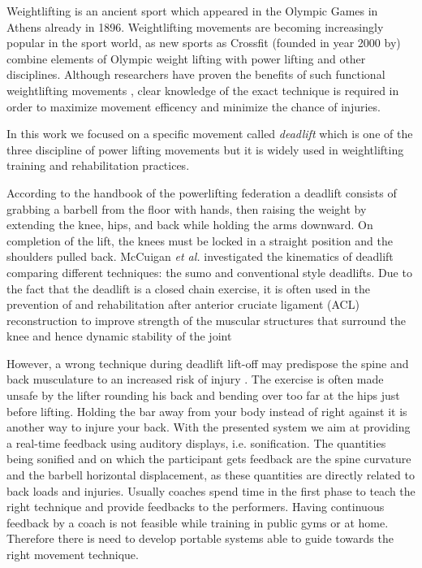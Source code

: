 \documentclass[10pt,letterpaper]{article}
\begin{document}
Weightlifting is an ancient sport which appeared in the Olympic Games in Athens already in 1896. Weightlifting movements are becoming increasingly popular in the sport world, as new sports as Crossfit (founded in year 2000 by) combine elements of Olympic weight lifting with power lifting and other disciplines.
Although researchers have proven the benefits of such functional weightlifting movements \cite{smith2013crossfit}, clear knowledge of the exact technique is required in order to maximize movement efficency and minimize the chance of injuries.

In this work we focused on a specific movement called \emph{deadlift} which is one of the three discipline of power lifting movements but it is widely used in weightlifting training and rehabilitation practices.

According to the handbook of the powerlifting federation \cite{} a deadlift consists of grabbing a barbell from the floor with hands, then raising the weight by extending the knee, hips, and back while holding the arms downward. On completion of the lift, the knees must be locked in a straight position and the shoulders pulled back.
McCuigan \emph{et al.} investigated the kinematics of deadlift comparing different techniques: the sumo and conventional style deadlifts.
Due to the fact that the deadlift is a closed chain exercise, it is often used in the prevention of and rehabilitation after anterior cruciate ligament (ACL) reconstruction to improve strength of the muscular structures that surround the knee and hence dynamic stability of the joint 

However, a wrong technique during deadlift lift-off may predispose the spine and back musculature to an increased risk of injury \cite{granhed1987loads,cholewicki1991lumbar}. The exercise is often made unsafe by the lifter rounding his back and bending over too far at the hips just before lifting. Holding the bar away from your body instead of right against it is another way to injure your back. 
With the presented system we aim at providing a real-time feedback using auditory displays, i.e. sonification. The quantities being sonified and on which the participant gets feedback are the spine curvature and the barbell horizontal displacement, as these quantities are directly related to back loads and injuries.
Usually coaches spend time in the first phase to teach the right technique and provide feedbacks to the performers.
Having continuous feedback by a coach is not feasible while training in public gyms or at home. Therefore there is need to develop portable systems able to guide towards the right movement technique.
\end{document}
